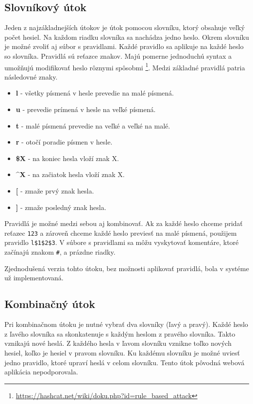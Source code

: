 \documentclass[slovak]{fitthesis}
\begin{document}
\subsection{Slovníkový útok} \label{dictAttack}
Jeden z najzákladnejších útokov je útok pomocou slovníku, ktorý obsahuje veľký počet hesiel. Na každom riadku slovníka sa nachádza jedno heslo. Okrem slovníku je možné zvoliť aj súbor s pravidlami. Každé pravidlo sa aplikuje na každé heslo so slovníka. Pravidlá sú reťazce znakov. Majú pomerne jednoduchú syntax a umožňujú modifikovať heslo rôznymi spôsobmi \footnote{\url{https://hashcat.net/wiki/doku.php?id=rule_based_attack}}. Medzi základné pravidlá patria následovné znaky.
\begin{itemize}
    \item \textbf{l} - všetky písmená v hesle prevedie na malé písmená.
    \item \textbf{u} - prevedie prímená v hesle na veľké písmená.
    \item \textbf{t} - malé písmená prevedie na veľké a veľké na malé.
    \item \textbf{r} - otočí poradie písmen v hesle.
    \item \textbf{\$X} - na koniec hesla vloží znak X.
    \item \textbf{\^{}X} - na začiatok hesla vloží znak X. 
    \item \textbf{[} - zmaže prvý znak hesla.
    \item \textbf{]} - zmaže posledný znak hesla.
\end{itemize}
Pravidlá je možné medzi sebou aj kombinovať. Ak za každé heslo chceme pridať reťazec \texttt{123} a zároveň chceme každé heslo previesť na malé písmená, použijem pravidlo \texttt{l\$1\$2\$3}. V súbore s pravidlami sa môžu vyskytovať komentáre, ktoré začínajú znakom \texttt{\#}, a prázdne riadky.

Zjednodušená verzia tohto útoku, bez možnosti aplikovať pravidlá, bola v systéme už implementovaná.

\subsection{Kombinačný útok} \label{combAttack}
Pri kombinačnom útoku je nutné vybrať dva slovníky (ľavý a pravý). Každé heslo z ľavého slovníka sa skonkatenuje s každým heslom z pravého slovníka. Takto vznikajú nové heslá. Z každého hesla v ľavom slovníku vznikne toľko nových hesiel, koľko je hesiel v pravom slovníku. Ku každému slovníku je možné uviesť jedno pravidlo, ktoré upraví heslá v celom slovníku. Tento útok pôvodná webová aplikácia nepodporovala.
\end{document}
